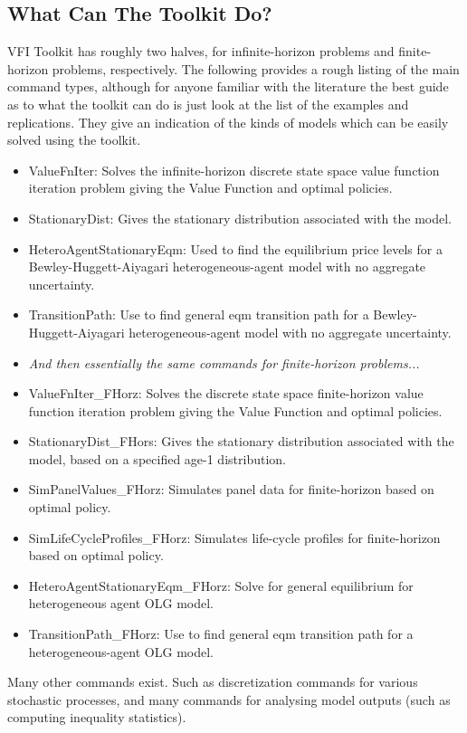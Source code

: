\documentclass[11pt,fleqn]{article}
\begin{document}
\subsection{What Can The Toolkit Do?}
VFI Toolkit has roughly two halves, for infinite-horizon problems and finite-horizon problems, respectively.
The following provides a rough listing of the main command types, although for anyone familiar with the literature the best guide as to what the toolkit can do is just look at the list of the examples and replications. They give an indication of the kinds of models which can be easily solved using the toolkit.
\begin{itemize}
 \item ValueFnIter: Solves the infinite-horizon discrete state space value function iteration problem giving the Value Function and optimal policies.
 \item StationaryDist: Gives the stationary distribution associated with the model.
 \item HeteroAgentStationaryEqm: Used to find the equilibrium price levels for a Bewley-Huggett-Aiyagari heterogeneous-agent model with no aggregate uncertainty.
 \item TransitionPath: Use to find general eqm transition path for a Bewley-Huggett-Aiyagari heterogeneous-agent model with no aggregate uncertainty.
 \item[] \textit{And then essentially the same commands for finite-horizon problems...}
 \item ValueFnIter\_{}FHorz: Solves the discrete state space finite-horizon value function iteration problem giving the Value Function and optimal policies.
 \item StationaryDist\_{}FHors: Gives the stationary distribution associated with the model, based on a specified age-1 distribution.
 \item SimPanelValues\_{}FHorz: Simulates panel data for finite-horizon based on optimal policy.
 \item SimLifeCycleProfiles\_{}FHorz: Simulates life-cycle profiles for finite-horizon based on optimal policy.
 \item HeteroAgentStationaryEqm\_{}FHorz: Solve for general equilibrium for heterogeneous agent OLG model.
 \item TransitionPath\_{}FHorz: Use to find general eqm transition path for a heterogeneous-agent OLG model.
\end{itemize}

Many other commands exist. Such as discretization commands for various stochastic processes, and many commands for analysing model outputs (such as computing inequality statistics).
\end{document}

